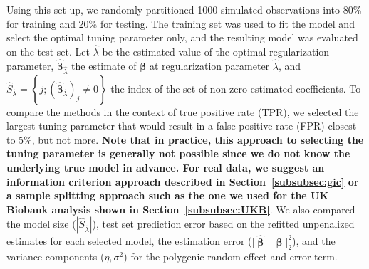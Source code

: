 \documentclass[12pt,letter]{article}\usepackage[]{graphicx}\usepackage[]{color}
\makeatletter
\newcommand{\bX}{\textbf{X}}
\newcommand{\bY}{\textbf{Y}}
\newcommand{\bbeta}{\boldsymbol{\beta}}
\DeclarePairedDelimiter\norm{\lVert}{\rVert}%
\let\oldnorm\norm
\def\norm{\@ifstar{\oldnorm}{\oldnorm*}}
\makeatother
\begin{document}
Using this set-up, we randomly partitioned 1000 simulated observations into 80\% for training and 20\% for testing. The training set was used to fit the model and select the optimal tuning parameter only, and the resulting model was evaluated on the test set. Let $\hat{\lambda}$ be the estimated value of the optimal regularization parameter, $\widehat{\bbeta}_{\hat{\lambda}}$ the estimate of $\bbeta$ at regularization parameter $\hat{\lambda}$, and $\widehat{S}_{\hat{\lambda}} = \left\lbrace j; (\widehat{\bbeta}_{\hat{\lambda}})_j \neq 0 \right\rbrace$ the index of the set of non-zero estimated coefficients. To compare the methods in the context of true positive rate (TPR), we selected the largest tuning parameter that would result in a false positive rate (FPR) closest to 5\%, but not more. \textbf{Note that in practice, this approach to selecting the tuning parameter is generally not possible since we do not know the underlying true model in advance. For real data, we suggest an information criterion approach described in Section~\ref{subsubsec:gic} or a sample splitting approach such as the one we used for the UK Biobank analysis shown in Section~\ref{subsubsec:UKB}}. We also compared the model size ($|\widehat{S}_{\hat{\lambda}}|$), test set prediction error based on the refitted unpenalized estimates for each selected model, the estimation error ($||\widehat{\bbeta} - \bbeta||_2^2$), and the variance components ($\eta, \sigma^2$) for the polygenic random effect and error term. %

\end{document}
